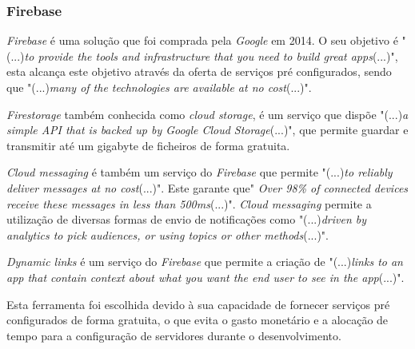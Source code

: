 \subsubsection{Firebase}
\emph{Firebase} é uma solução que foi comprada pela \textit{Google} em 2014. O seu objetivo é "(...)\emph{to provide the tools and infrastructure that you need to build great apps}(...)"\citep{Moroney2017}, esta alcança este objetivo através da oferta de serviços pré configurados, sendo que "(...)\emph{many of the technologies are available at no cost}(...)"\citep{Moroney2017}.

\textit{Firestorage} também conhecida como \textit{cloud storage}, é um serviço que dispõe "(...)\emph{a simple API that is backed up by Google Cloud Storage}(...)"\citep{Moroney2017}, que permite guardar e transmitir até um gigabyte de ficheiros de forma gratuita.

\textit{Cloud messaging} é também um serviço do \textit{Firebase} que permite "(...)\emph{to reliably deliver messages at no cost}(...)"\citep{Moroney2017}. Este garante que" \emph{Over 98\% of connected devices receive these messages in less than 500ms}(...)"\citep{Moroney2017}. \textit{Cloud messaging} permite a utilização de diversas formas de envio de notificações como "(...)\emph{driven by analytics to pick audiences, or using topics or other methods}(...)"\citep{Moroney2017}.

\textit{Dynamic links} é um serviço do \textit{Firebase} que permite a criação de "(...)\emph{links to an app that contain context about what you want the end user to see in the app}(...)"\citep{Moroney2017}.

Esta ferramenta foi escolhida devido à sua capacidade de fornecer serviços pré configurados de forma gratuita, o que evita o gasto monetário e a alocação de tempo para a configuração de servidores durante o desenvolvimento.
